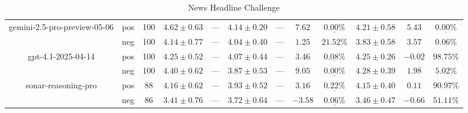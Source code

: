 \begin{table}[ht!]
{\begin{tabular}{| c || c | c || c | c || c | c | c | c || c | c | c ||}
      gemini-2.5-pro-preview-05-06
        & pos
        & 100
        & $4.62 \pm 0.63$
        & $\text{---}$
        & $4.14 \pm 0.20$
        & $\text{---}$
        & $7.62$
        & $\underline{\mathbf{0.00\%}}$
        & $4.21 \pm 0.58$
        & $5.43$
        & $\underline{\mathbf{0.00\%}}$ \\
        & neg
        & 100
        & $4.14 \pm 0.77$
        & $\text{---}$
        & $4.04 \pm 0.40$
        & $\text{---}$
        & $1.25$
        & $21.52\text{\%}$
        & $3.83 \pm 0.58$
        & $3.57$
        & $\underline{\mathbf{0.06\%}}$ \\
    \hline


      gpt-4.1-2025-04-14
        & pos
        & 100
        & $4.25 \pm 0.52$
        & $\text{---}$
        & $4.07 \pm 0.44$
        & $\text{---}$
        & $3.46$
        & $\underline{\mathbf{0.08\%}}$
        & $4.25 \pm 0.26$
        & $-0.02$
        & $98.75\text{\%}$ \\
        & neg
        & 100
        & $4.40 \pm 0.62$
        & $\text{---}$
        & $3.87 \pm 0.53$
        & $\text{---}$
        & $9.05$
        & $\underline{\mathbf{0.00\%}}$
        & $4.28 \pm 0.39$
        & $1.98$
        & $5.02\text{\%}$ \\
    \hline


      sonar-reasoning-pro
        & pos
        & 88
        & $4.16 \pm 0.62$
        & $\text{---}$
        & $3.93 \pm 0.52$
        & $\text{---}$
        & $3.16$
        & $\underline{\mathbf{0.22\%}}$
        & $4.15 \pm 0.40$
        & $0.11$
        & $90.97\text{\%}$ \\
        & neg
        & 86
        & $3.41 \pm 0.76$
        & $\text{---}$
        & $3.72 \pm 0.64$
        & $\text{---}$
        & $-3.58$
        & $\underline{\mathbf{0.06\%}}$
        & $3.46 \pm 0.47$
        & $-0.66$
        & $51.11\text{\%}$ \\
    \hline


      \hline
    \end{tabular}
  }
  \caption{News Headline Challenge}
  \label{tbleval-news}
\end{table}


